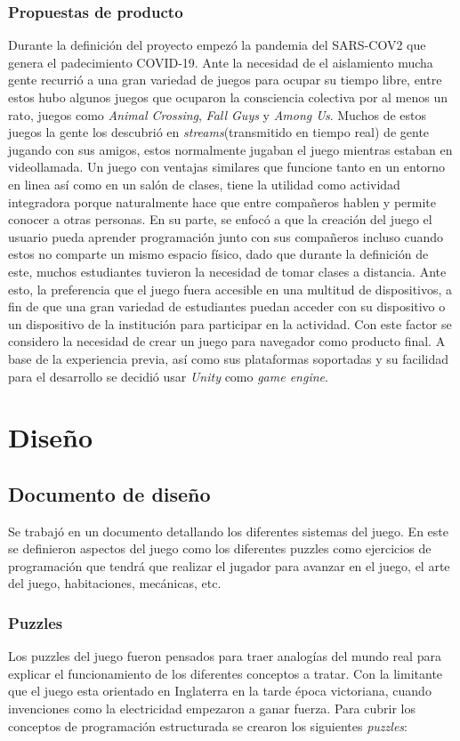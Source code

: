 \subsubsection{Propuestas de producto}
Durante la definición del proyecto empezó la pandemia del SARS-COV2 que genera el padecimiento COVID-19. Ante la necesidad de el aislamiento mucha gente recurrió a una gran variedad de juegos para ocupar su tiempo libre, entre estos hubo algunos juegos que ocuparon la consciencia colectiva por al menos un rato, juegos como \textit{Animal Crossing}, \textit{Fall Guys} y \textit{Among Us}. Muchos de estos juegos la gente los descubrió en \textit{streams}(transmitido en tiempo real) de gente jugando con sus amigos, estos normalmente jugaban el juego mientras estaban en videollamada. Un juego con ventajas similares que funcione tanto en un entorno en linea así como en un salón de clases, tiene la utilidad como actividad integradora porque naturalmente hace que entre compañeros hablen y permite conocer a otras personas.
En su parte, se enfocó a que la creación del juego el usuario pueda aprender programación junto con sus compañeros incluso cuando estos no comparte un mismo espacio físico, dado que durante la definición de este, muchos estudiantes tuvieron la necesidad de tomar clases a distancia. Ante esto, la preferencia que el juego fuera accesible en una multitud de dispositivos, a fin de que una gran variedad de estudiantes puedan acceder con su dispositivo o un dispositivo de la institución para participar en la actividad. Con este factor se considero la necesidad de crear un juego para navegador como producto final. A base de la experiencia previa, así como sus plataformas soportadas y su facilidad para el desarrollo se decidió usar \textit{Unity} como \textit{game engine}.

\section{Diseño}
\subsection{Documento de diseño}
Se trabajó en un documento detallando los diferentes sistemas del juego. En este se definieron aspectos del juego como los diferentes puzzles como ejercicios de programación que tendrá que realizar el jugador para avanzar en el juego, el arte del juego, habitaciones, mecánicas, etc.

\subsubsection{Puzzles}
Los puzzles del juego fueron pensados para traer analogías del mundo real para explicar el funcionamiento de los diferentes conceptos a tratar. Con la limitante que el juego esta orientado en Inglaterra en la tarde época victoriana, cuando invenciones como la electricidad empezaron a ganar fuerza.
Para cubrir los conceptos de programación estructurada se crearon los siguientes \textit{puzzles}:

